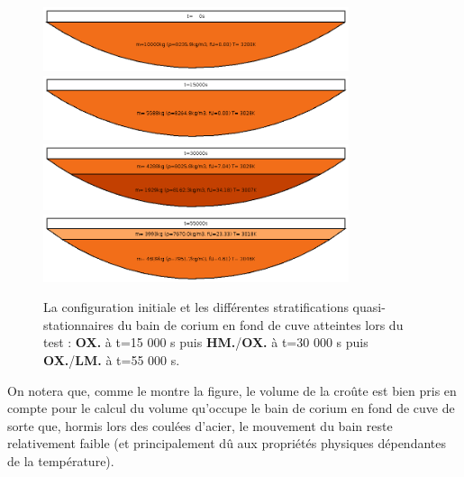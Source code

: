 \begin{figure}
\centering
\includegraphics[width=0.8\textwidth, keepaspectratio=true]{Figures/coriumPool_t=00000.png}\\
\includegraphics[width=0.8\textwidth, keepaspectratio=true]{Figures/coriumPool_t=15000.png}\\
\includegraphics[width=0.8\textwidth, keepaspectratio=true]{Figures/coriumPool_t=30000.png}\\
\includegraphics[width=0.8\textwidth, keepaspectratio=true]{Figures/coriumPool_t=55000.png}
\caption{La configuration initiale et les différentes stratifications quasi-stationnaires du bain de corium en fond de cuve atteintes lors du test : \textcolor{orange!75!black}{\textbf{OX.}} à t=15 000 s puis \textcolor{red!50!black}{\textbf{HM.}}/\textcolor{orange!75!black}{\textbf{OX.}} à t=30 000 s puis \textcolor{orange!75!black}{\textbf{OX.}}/\textcolor{orange!50!white}{\textbf{LM.}} à t=55 000 s.}
\label{fig:stratification_bains}
\end{figure}
On notera que, comme le montre la figure, le volume de la croûte est bien pris en compte pour le calcul du volume qu'occupe le bain de corium en fond de cuve de sorte que, hormis lors des coulées d'acier, le mouvement du bain reste relativement faible (et principalement dû aux propriétés physiques dépendantes de la température).

